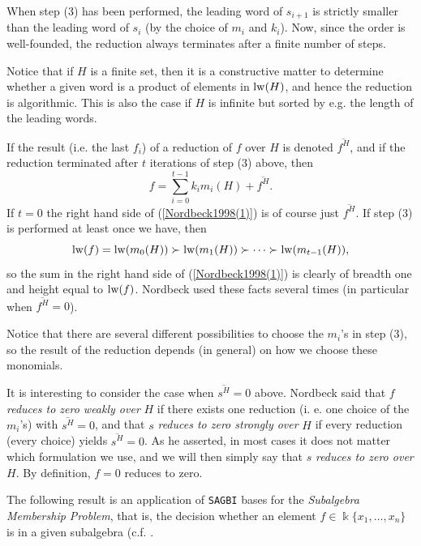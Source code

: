 \documentclass{amsart}
\theoremstyle{definition}
\theoremstyle{remark}
\numberwithin{equation}{section}
\begin{document}
When step (3) has been performed, the leading word of $s_{i+1}$ is strictly smaller than the leading word of $s_i$ (by the choice of $m_i$ and $k_i$). Now, since the order is well-founded, the reduction always terminates after a finite number of steps.

Notice that if $H$ is a finite set, then it is a constructive matter to determine whether a given word is a product of elements in ${\rm lw}(H)$, and hence the reduction is algorithmic. This is also the case if $H$ is infinite but sorted by e.g. the length of the leading words.

If the result (i.e. the last $f_i$) of a reduction of $f$ over $H$ is denoted $\overline{f^{H}}$, and if the reduction terminated after $t$ iterations of step (3) above, then 
\begin{equation}\label{Nordbeck1998(1)}
    f = \sum_{i = 0}^{t-1} k_im_i(H) + \overline{f^{H}}.
\end{equation}
If $t = 0$ the right hand side of (\ref{Nordbeck1998(1)}) is of course just $\overline{f^H}$. If step (3) is performed at least once we have, then
\begin{equation}\label{Nordbeck1998(2)}
    {\rm lw}(f) = {\rm lw}(m_0(H)) \succ {\rm lw}(m_1(H)) \succ \dotsb \succ {\rm lw}(m_{t-1}(H)),
\end{equation}
so the sum in the right hand side of (\ref{Nordbeck1998(1)}) is clearly of breadth one and height equal to ${\rm lw}(f)$. Nordbeck used these facts several times (in particular when $\overline{f^H} = 0$).

Notice that there are several different possibilities to choose the $m_i$'s in step (3), so the result of the reduction depends (in general) on how we choose these monomials.

It is interesting to consider the case when $\overline{s^H} = 0$ above. Nordbeck \cite[p. 142]{Nordbeck1998} said that $f$ {\em reduces to zero weakly over} $H$ if there exists one reduction (i. e. one choice of the $m_i$'s) with $\overline{s^H} = 0$, and that $s$ {\em reduces to zero strongly over} $H$ if every reduction (every choice) yields $\overline{s^H} = 0$. As he asserted, in most cases it does not matter which formulation we use, and we will then simply say that $s$ {\em reduces to zero over} $H$. By definition, $f = 0$ reduces to zero.

The following result is an application of \texttt{SAGBI} bases for the {\em Subalgebra Membership Problem}, that is, the decision whether an element $f\in \Bbbk \{x_1, \dotsc, x_n\}$ is in a given subalgebra (c.f. \cite[Theorem 6.6.25 (C1)]{KreuzerRobbiano2005}.
\end{document}
